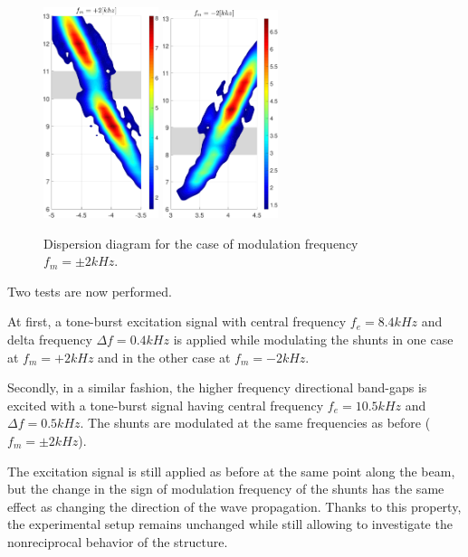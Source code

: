 \begin{figure}[H]
    \centering
    \includegraphics[width=0.3\textwidth]{img/MATLAB/EXP_nonreciprocal_@+2kHz.pdf}
    \hspace{2cm}
    \includegraphics[width=0.3\textwidth]{img/MATLAB/EXP_nonreciprocal_@-2kHz.pdf}
    \caption{Dispersion diagram for the case of modulation frequency $f_m = \pm 2 kHz$.}
    \label{fig:nonreciprocal_behavior_2kHz}
\end{figure}

Two tests are now performed.

At first, a tone-burst excitation signal with central frequency $f_e = 8.4 kHz$ and delta frequency $\Delta f = 0.4 kHz$ is applied while modulating the shunts in one case at $f_m = +2 kHz$ and in the other case at $f_m = -2 kHz$.

Secondly, in a similar fashion, the higher frequency directional band-gaps is excited with a tone-burst signal having central frequency $f_e = 10.5 kHz$ and $\Delta f = 0.5 kHz$.
The shunts are modulated at the same frequencies as before ($f_m = \pm 2 kHz$).

The excitation signal is still applied as before at the same point along the beam, but the change in the sign of modulation frequency of the shunts has the same effect as changing the direction of the wave propagation.
Thanks to this property, the experimental setup remains unchanged while still allowing to investigate the nonreciprocal behavior of the structure.



